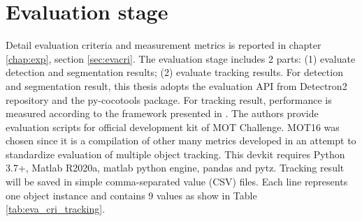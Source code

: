 \section{Evaluation stage}
Detail evaluation criteria and measurement metrics is reported in chapter \ref{chap:exp}, section \ref{sec:evacri}. The evaluation stage includes 2 parts: (1) evaluate detection and segmentation results; (2) evaluate tracking results. For detection and segmentation result, this thesis adopts the evaluation API from Detectron2 repository and the py-cocotools package. For tracking result, performance is measured according to the framework presented in \cite{DBLP:journals/corr/MilanL0RS16}. The authors provide evaluation scripts for official development kit of MOT Challenge. MOT16 was chosen since it is a compilation of other many metrics developed in an attempt to standardize evaluation of multiple object tracking. This devkit requires Python 3.7+, Matlab R2020a, matlab python engine, pandas and pytz. Tracking result will be saved in simple comma-separated value (CSV) files. Each line represents one object instance and contains 9 values as show in Table \ref{tab:eva_cri_tracking}.
